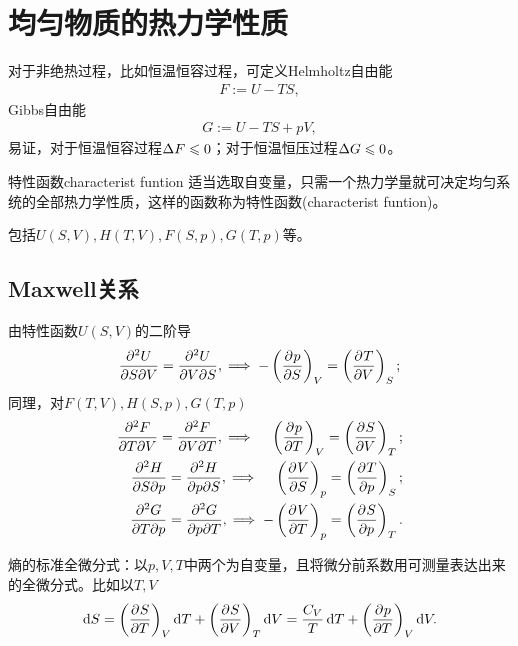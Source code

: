 \chapter{均匀物质的热力学性质}
对于非绝热过程，比如恒温恒容过程，可定义Helmholtz自由能
\begin{align}
	F:=U-TS,
\end{align}
Gibbs自由能
\begin{align}
	G:=U-TS+pV,
\end{align}
易证，对于恒温恒容过程$\D F\leqslant 0$；对于恒温恒压过程$\D G\leqslant 0$。
\begin{definition}{特性函数}{characterist funtion}
	适当选取自变量，只需一个热力学量就可决定均匀系统的全部热力学性质，这样的函数称为特性函数(characterist funtion)。
	
	包括$U(S,V),H(T,V),F(S,p),G(T,p)$等。
\end{definition}
\section{Maxwell关系}
由特性函数$U(S,V)$的二阶导
\begin{align}
	\pw USV=\pw UVS,\implies-\kh{\pv pS}_V=\kh{\pv TV}_S;
\end{align}
同理，对$F(T,V),H(S,p),G(T,p)$
\begin{align}
	\pw FTV=\pw FVT,\implies\quad\kh{\pv pT}_V=\kh{\pv SV}_T; \\
	\pw HSp=\pw HpS,\implies\quad\kh{\pv VS}_p=\kh{\pv Tp}_S; \\
	\pw GTp=\pw GpT,\implies-\kh{\pv VT}_p=\kh{\pv Sp}_T.
\end{align}
\begin{center}
\end{center}
熵的标准全微分式：以$p,V,T$中两个为自变量，且将微分前系数用可测量表达出来的全微分式。比如以$T,V$
\[
	\d S=\kh{\pv ST}_V\d T+\kh{\pv SV}_T\d V=\frac{C_V}T\d T+\kh{\pv pT}_V\d V.
\]
\iffalse
